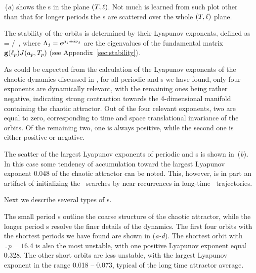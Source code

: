 \,(\textit{a}) shows the \rpo s in the plane
$(\period{},\shift)$.  Not much is learned from such plot other than
that for longer periods the \rpo s are scattered over the
whole $(\period{},\shift)$ plane.

The stability of the orbits is determined by their Lyapunov exponents,
defined as
\beq
{} = \eigRe[j]/ \,,
where $\ExpaEig_j = e^{\eigRe[j] \pm i \eigIm[j]}$ are the
eigenvalues of the fundamental matrix $\mathbf{g}(\shift_p)J(a_p,\period{p})$ 
(see Appendix~\ref{sec:stability}).

As could be expected from the calculation of the Lyapunov exponents
of the chaotic dynamics discussed in , for all
periodic and \rpo s we have found, only four 
exponents are dynamically relevant, with the remaining ones being
rather negative, indicating strong contraction towards the
4-dimensional manifold containing the chaotic attractor.  Out of the
four relevant exponents, two are equal to zero, corresponding to
time and space translational invariance of the orbits.  Of the
remaining two, one is always positive, while the second one is
either positive or negative.

The scatter of the largest Lyapunov exponents
of periodic and \rpo s is shown in \,(\textit{b}).
In this case some tendency of accumulation toward the largest
Lyapunov exponent 0.048 of the chaotic attractor
can be noted.  This, however, is in part an artifact of initializing
the \rpo\ searches by near recurrences in long-time \statesp\
trajectories.

Next we describe several types of \rpo s.


The small period \rpo s outline the coarse structure of the chaotic
attractor, while the longer period \rpo s resolve the finer details
of the dynamics.
The first four orbits with the shortest periods we have found are
shown in \reffig{f:ks22rpos}(\textit{a-d}).  The shortest orbit with
$\period{p} = 16.4$ is also the most unstable, with one positive
Lyapunov exponent equal 0.328.  The other short orbits are less
unstable, with the largest Lyapunov exponent %
in the range
0.018 -- 0.073, typical of the long time attractor average.

